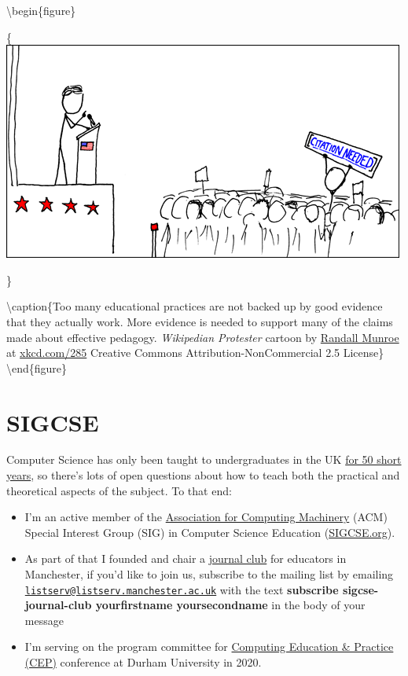 \documentclass[12pt,]{book}
\providecommand{\tightlist}{%
  \setlength{\itemsep}{0pt}\setlength{\parskip}{0pt}}
\begin{document}
\textbackslash{}begin\{figure\}

\{\centering \includegraphics[width=0.7\linewidth]{images/wikipedian_protester}

\}

\textbackslash{}caption\{Too many educational practices are not backed up by good evidence that they actually work. More evidence is needed to support many of the claims made about effective pedagogy. \emph{Wikipedian Protester} cartoon by \href{https://en.wikipedia.org/wiki/Randall_Munroe}{Randall Munroe} at \href{https://xkcd.com/285/}{xkcd.com/285} Creative Commons Attribution-NonCommercial 2.5 License\}\label{fig:unnamed-chunk-6}
\textbackslash{}end\{figure\}

\hypertarget{sigcse}{%
\section{SIGCSE}\label{sigcse}}

Computer Science has only been taught to undergraduates in the UK \href{http://www.bbc.co.uk/manchester/content/articles/2005/11/07/baby_computer_40_interview_feature.shtml}{for 50 short years}, so there's lots of open questions about how to teach both the practical and theoretical aspects of the subject. To that end:

\begin{itemize}
\tightlist
\item
  I'm an active member of the \href{https://en.wikipedia.org/wiki/Association_for_Computing_Machinery}{Association for Computing Machinery} (ACM) Special Interest Group (SIG) in Computer Science Education (\href{https://sigcse.org}{SIGCSE.org}).
\item
  As part of that I founded and chair a \href{https://duncan.hull.name/2019/07/17/sigcse-journal-club/}{journal club} for educators in Manchester, if you'd like to join us, subscribe to the mailing list by emailing \href{mailto:listserv@listserv.manchester.ac.uk}{\nolinkurl{listserv@listserv.manchester.ac.uk}} with the text \textbf{subscribe sigcse-journal-club yourfirstname yoursecondname} in the body of your message
\item
  I'm serving on the program committee for \href{http://community.dur.ac.uk/cep.conference}{Computing Education \& Practice (CEP)} conference at Durham University in 2020.
\end{itemize}
\end{document}
